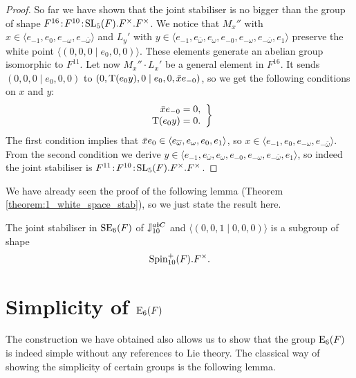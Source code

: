 \begin{proof}
So far we have shown that the joint stabiliser is  no bigger than the group of shape  \mbox{$F^{16}\mathord{{\;\!{:}\;\!}} F^{10}\mathord{{\;\!{:}\;\!}} \mathrm{SL}_5(F).F^{\times}.F^{\times}$}.
We notice that $M_x''$ with $x \in \langle e_{-1}, e_0, e_{-\omega}, e_{-\bar{\omega}} \rangle$ and $L_y'$ with 
$y \in \langle e_{-1}, e_{\bar{\omega}}, e_{\omega}, e_{-0}, e_{-\omega}, e_{-\bar{\omega}}, e_1\rangle$ preserve
the white point $\langle (0,0,0 \mid e_0,0,0) \rangle$. These elements generate an abelian group isomorphic to $F^{11}$. Let now
$M_x'' \cdot L_x'$ be a general element in $F^{16}$. It sends $(0,0,0 \mid e_0, 0,0)$ to $(0,\operatorname{T}(e_0 y),0 \mid e_0, 0, \mathord{\mbox{\hspace*{0pt}}\,\overline{\!x\!\!\;}\!\:}\mbox{\hspace*{0pt}} e_{-0})$,
so we get the following conditions on $x$ and $y$:
\begin{equation*}
	\left.
		\begin{array}{r@{\;}c@{\;}l}
			\ovx e_{-0} & = & 0, \\
			\Tr(e_0 y) & = & 0.
		\end{array}
	\right\}
\end{equation*}
The first condition implies that $\mathord{\mbox{\hspace*{0pt}}\,\overline{\!x\!\!\;}\!\:}\mbox{\hspace*{0pt}} e_0 \in \langle e_{\overline{\omega}}, e_{\omega}, e_0, e_1 \rangle$, so
$x \in \langle e_{-1}, e_0, e_{-\omega}, e_{-\bar{\omega}} \rangle$. From the second condition we derive
$y \in \langle e_{-1}, e_{\bar{\omega}}, e_{\omega}, e_{-0}, e_{-\omega}, e_{-\bar{\omega}}, e_1\rangle$, 
so indeed the joint stabiliser is $F^{11}\mathord{{\;\!{:}\;\!}} F^{10} \mathord{{\;\!{:}\;\!}} \mathrm{SL}_5(F).F^{\times}.F^{\times}$. 
\end{proof}

We have already seen the proof of the following lemma (Theorem \ref{theorem:1_white_space_stab}), so we just state the result here.
\begin{lemma}
	\label{lemma1_stab_joint_3}
	The joint stabiliser in $\mathrm{SE}_6(F)$ of\phantom{;} $\mathbb{J}_{10}^{abC}$ and $\langle (0,0,1 \mid 0,0,0) \rangle$ is a subgroup
	of shape 
	\begin{equation}
		\mathrm{Spin}_{10}^+(F).F^{\times}.
	\end{equation}
\end{lemma}



\section{Simplicity of $\mathord{\mathrm{E}}_6(F)$}

The construction we have obtained also allows us to show that the group $\mathord{\mathrm{E}}_6(F)$ is indeed
simple without any references to Lie theory. The classical way of showing the simplicity of 
certain groups is the following lemma.

